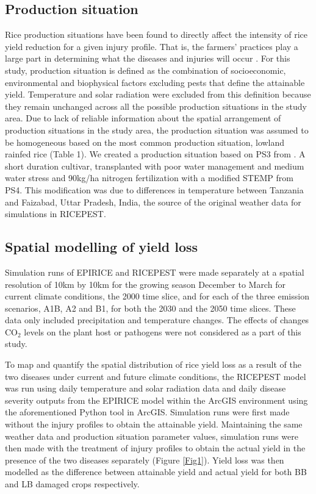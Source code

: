     \subsection{Production situation}
    \label{production_situation}
    Rice production situations have been found to directly affect the intensity of rice yield reduction for a given injury profile. That is, the farmers' practices play a large part in determining what the diseases and injuries will occur \citep{Savary2000}. For this study, production situation is defined as the combination of socioeconomic, environmental and biophysical factors excluding pests that define the attainable yield. Temperature and solar radiation were excluded from this definition because they remain unchanged across all the possible production situations in the study area. Due to lack of reliable information about the spatial arrangement of production situations in the study area, the production situation was assumed to be homogeneous based on the most common production situation, lowland rainfed rice \citep{Diagne2013} (Table 1). We created a production situation based on PS3 from \citep{Willocquet2004}. A short duration cultivar, transplanted with poor water management and medium water stress and 90kg/ha nitrogen fertilization with a modified STEMP from PS4. This modification was due to differences in temperature between Tanzania and Faizabad, Uttar Pradesh, India, the source of the original weather data for simulations in RICEPEST.
    
    \subsection{Spatial modelling of yield loss}
    \label{modelling_yield_loss}
    Simulation runs of EPIRICE and RICEPEST were made separately at a spatial resolution of 10km by 10km for the growing season December to March for current climate conditions, the 2000 time slice, and for each of the three emission scenarios, A1B, A2 and B1, for both the 2030 and the 2050 time slices. These data only included precipitation and temperature changes. The effects of changes CO$_{2}$ levels on the plant host or pathogens were not considered as a part of this study.
    
    To map and quantify the spatial distribution of rice yield loss as a result of the two diseases under current and future climate conditions, the RICEPEST model was run using daily temperature and solar radiation data and daily disease severity outputs from the EPIRICE model within the ArcGIS environment using the aforementioned Python tool in ArcGIS. Simulation runs were first made without the injury profiles to obtain the attainable yield. Maintaining the same weather data and production situation parameter values, simulation runs were then made with the treatment of injury profiles to obtain the actual yield in the presence of the two diseases separately (Figure \ref{Fig1}). Yield loss was then modelled as the difference between attainable yield and actual yield for both BB and LB damaged crops respectively.
    
